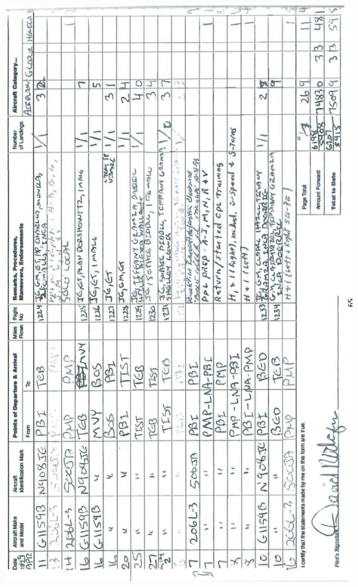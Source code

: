 \documentclass[10pt]{article}
\begin{document}
\includegraphics[max width=\textwidth, center]{2025_02_27_dd68c3d38de88f0516d9g-069}
\end{document}

